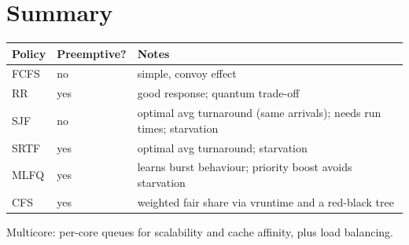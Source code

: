 \section*{Summary}
\begin{center}
\begin{tabular}{@{}lll@{}}
\toprule
Policy & Preemptive? & Notes \\
\midrule
FCFS & no & simple, convoy effect \\
RR & yes & good response; quantum trade-off \\
SJF & no & optimal avg turnaround (same arrivals); needs run times; starvation \\
SRTF & yes & optimal avg turnaround; starvation \\
MLFQ & yes & learns burst behaviour; priority boost avoids starvation \\
CFS & yes & weighted fair share via vruntime and a red-black tree \\
\bottomrule
\end{tabular}
\end{center}
Multicore: per-core queues for scalability and cache affinity, plus load balancing.
